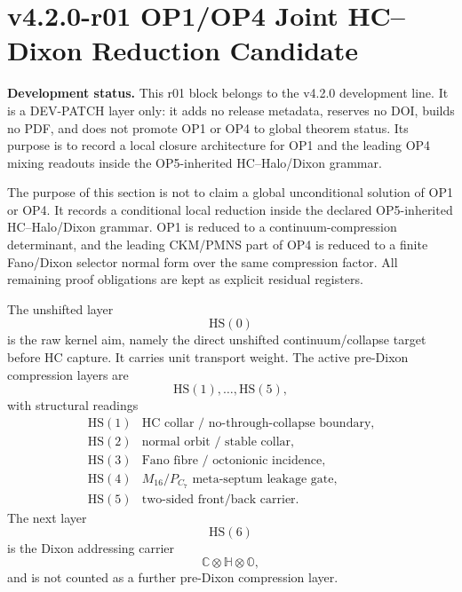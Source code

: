 \clearpage
\section*{v4.2.0-r01 OP1/OP4 Joint HC--Dixon Reduction Candidate}
\noindent\textbf{Development status.}  This r01 block belongs to the v4.2.0 development line.  It is a DEV-PATCH layer only: it adds no release metadata, reserves no DOI, builds no PDF, and does not promote OP1 or OP4 to global theorem status.  Its purpose is to record a local closure architecture for OP1 and the leading OP4 mixing readouts inside the OP5-inherited HC--Halo/Dixon grammar.

\begin{remark}
The purpose of this section is not to claim a global unconditional solution of OP1 or OP4.  It records a conditional local reduction inside the declared OP5-inherited HC--Halo/Dixon grammar.  OP1 is reduced to a continuum-compression determinant, and the leading CKM/PMNS part of OP4 is reduced to a finite Fano/Dixon selector normal form over the same compression factor.  All remaining proof obligations are kept as explicit residual registers.
\end{remark}

\begin{definition}
The unshifted layer
\[
  \mathrm{HS}(0)
\]
is the raw kernel aim, namely the direct unshifted continuum/collapse target before HC capture.  It carries unit transport weight.  The active pre-Dixon compression layers are
\[
  \mathrm{HS}(1),\ldots,\mathrm{HS}(5),
\]
with structural readings
\[
\begin{array}{c|l}
\mathrm{HS}(1) & \text{HC collar / no-through-collapse boundary},\\
\mathrm{HS}(2) & \text{normal orbit / stable collar},\\
\mathrm{HS}(3) & \text{Fano fibre / octonionic incidence},\\
\mathrm{HS}(4) & M_{16}/P_{C_7}\text{ meta-septum leakage gate},\\
\mathrm{HS}(5) & \text{two-sided front/back carrier}.
\end{array}
\]
The next layer
\[
  \mathrm{HS}(6)
\]
is the Dixon addressing carrier
\[
  \mathbb C\otimes\mathbb H\otimes\mathbb O,
\]
and is not counted as a further pre-Dixon compression layer.
\end{definition}

